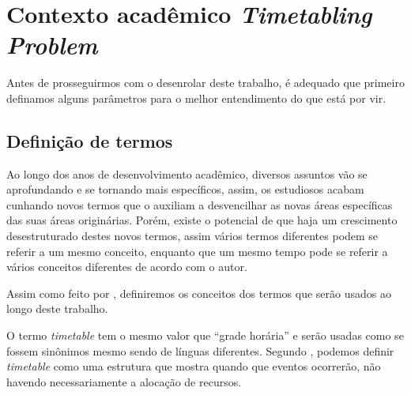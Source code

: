 \chapter{Contexto acadêmico \textit{Timetabling Problem}} \label{chap:contexto}

Antes de prosseguirmos com o desenrolar deste trabalho, é adequado que primeiro definamos alguns parâmetros para o melhor entendimento do que está por vir.


\section{Definição de termos} %

Ao longo dos anos de desenvolvimento acadêmico, diversos assuntos vão se aprofundando e se tornando mais específicos, assim, os estudiosos acabam cunhando novos termos que o auxiliam a desvencilhar as novas áreas específicas das suas áreas originárias. Porém, existe o potencial de que haja um crescimento desestruturado destes novos termos, assim vários termos diferentes podem se referir a um mesmo conceito, enquanto que um mesmo tempo pode se referir a vários conceitos diferentes de acordo com o autor.

Assim como feito por , definiremos os conceitos dos termos que serão usados ao longo deste trabalho.

O termo \textit{timetable} tem o mesmo valor que ``grade horária'' e serão usadas como se fossem sinônimos mesmo sendo de línguas diferentes. Segundo , podemos definir \textit{timetable} como uma estrutura que mostra quando que eventos ocorrerão, não havendo necessariamente a alocação de recursos.

